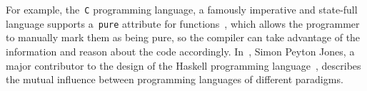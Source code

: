 \documentclass[a4paper]{article}
\theoremstyle{plain}
\theoremstyle{definition}
\begin{document}
For example, the~\texttt{C} programming language, a famously imperative
and state-full language supports a~\texttt{pure} attribute for
functions~\cite{gccdoc:attributes}, which allows the programmer to manually mark
them as being pure, so the compiler can take advantage of the information and
reason about the code accordingly. In~\cite{haskell-useless}, Simon Peyton
Jones, a major contributor to the design of the Haskell programming
language~\cite{Simeone}, describes the mutual influence between programming
languages of different paradigms.

\printbibliography
\end{document}
